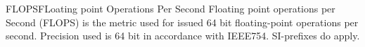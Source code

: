 {FLOPS}{FLoating point Operations Per Second}{%
	Floating point operations per Second (FLOPS) is the metric used for issued
	64 bit floating-point operations per second.
	Precision used is 64 bit in accordance with IEEE754.
	SI-prefixes do apply.%
}
%
